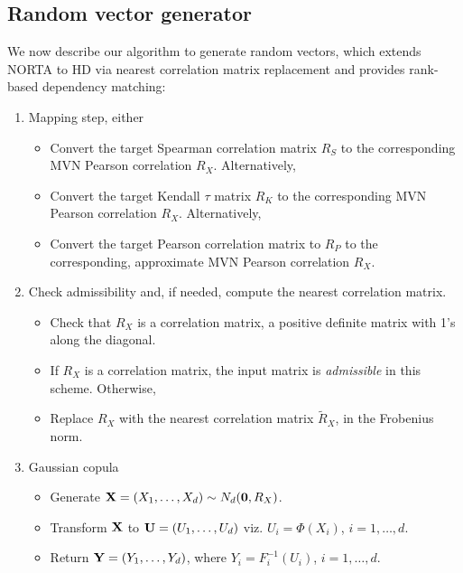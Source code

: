 \documentclass[
]{jss}
\providecommand{\tightlist}{%
  \setlength{\itemsep}{0pt}\setlength{\parskip}{0pt}}
\begin{document}
\hypertarget{rand-vec-gen}{%
\subsection{Random vector generator}\label{rand-vec-gen}}

We now describe our algorithm to generate random vectors, which extends NORTA to HD via nearest correlation matrix replacement and provides rank-based dependency matching:


\begin{enumerate}
\def\labelenumi{\arabic{enumi}.}
\tightlist
\item
  Mapping step, either

  \begin{itemize}
  \tightlist
  \item
    Convert the target Spearman correlation matrix \(R_S\) to the corresponding MVN Pearson correlation \(R_X\). Alternatively,
  \item
    Convert the target Kendall \(\tau\) matrix \(R_K\) to the corresponding MVN Pearson correlation \(R_X\). Alternatively,
  \item
    Convert the target Pearson correlation matrix to \(R_P\) to the corresponding, approximate MVN Pearson correlation \(R_X\).
  \end{itemize}
\item
  Check admissibility and, if needed, compute the nearest correlation matrix.

  \begin{itemize}
  \tightlist
  \item
    Check that \(R_X\) is a correlation matrix, a positive definite matrix with 1's along the diagonal.
  \item
    If \(R_X\) is a correlation matrix, the input matrix is \emph{admissible} in this scheme. Otherwise,
  \item
    Replace \(R_X\) with the nearest correlation matrix \(\tilde{R}_X\), in the Frobenius norm.
  \end{itemize}
\item
  Gaussian copula

  \begin{itemize}
  \tightlist
  \item
    Generate \({\bf X}=(X_1, \ldots, X_d) \sim N_d({\bf 0}, R_X)\).
  \item
    Transform \({\bf X}\) to \({\bf U} = (U_1, \ldots, U_d)\) viz. \(U_i=\Phi(X_i)\), \(i=1, \ldots, d\).
  \item
    Return \({\bf Y} = (Y_1, \ldots, Y_d)\), where \(Y_i=F_i^{-1}(U_i)\), \(i=1, \ldots, d\).
  \end{itemize}
\end{enumerate}
\end{document}

